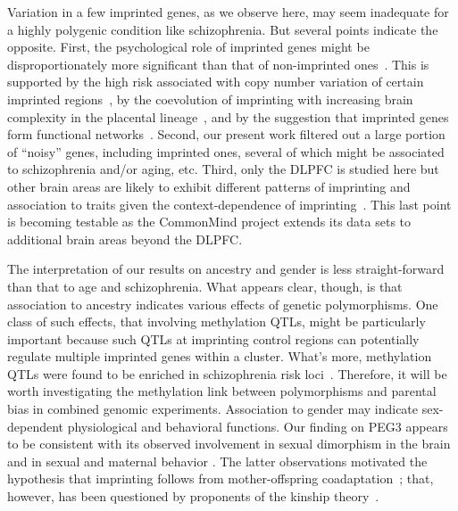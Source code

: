 \documentclass[letterpaper]{article}
\begin{document}
Variation in a few imprinted genes, as we observe here, may seem inadequate
for a highly polygenic condition like schizophrenia.  But several points
indicate the opposite.  First, the psychological role of imprinted genes might
be disproportionately more significant than that of non-imprinted
ones~\cite{Crespi2008a}.  This is supported by the high risk associated with
copy number variation of certain imprinted regions~\cite{McNamara2013}, by the
coevolution of imprinting with increasing brain complexity in the placental
lineage~\cite{Renfree2012}, and by the suggestion that imprinted genes form
functional networks~\cite{Varrault2006}.  Second, our present work filtered
out a large portion of ``noisy'' genes, including imprinted ones, several of
which might be associated to schizophrenia and/or aging, etc.  Third, only the
DLPFC is studied here but other brain areas are likely to exhibit different
patterns of imprinting and association to traits given the context-dependence
of imprinting~\cite{Perez2015,DeVeale2012}.  This last point is becoming
testable as the CommonMind project extends its data sets to additional brain
areas beyond the DLPFC.

The interpretation of our results on ancestry and gender is less
straight-forward than that to age and schizophrenia.  What appears clear,
though, is that association to ancestry indicates various effects of genetic
polymorphisms.  One class of such effects, that involving methylation QTLs,
might be particularly important because such QTLs at imprinting control
regions can potentially regulate multiple imprinted genes within a cluster.
What's more, methylation QTLs were found to be enriched in schizophrenia risk
loci~\cite{Hannon2016}.  Therefore, it will be worth investigating the
methylation link between polymorphisms and parental bias in combined genomic
experiments.  Association to gender may indicate sex-dependent physiological
and behavioral functions.  Our finding on PEG3 appears to be consistent with
its observed involvement in sexual dimorphism in the brain and in sexual and
maternal behavior \cite{Broad2009}.  The latter observations motivated the
hypothesis that imprinting follows from mother-offspring
coadaptation~\cite{Keverne2015}; that, however, has been questioned by
proponents of the kinship theory~\cite{Haig2014}.
\end{document}
